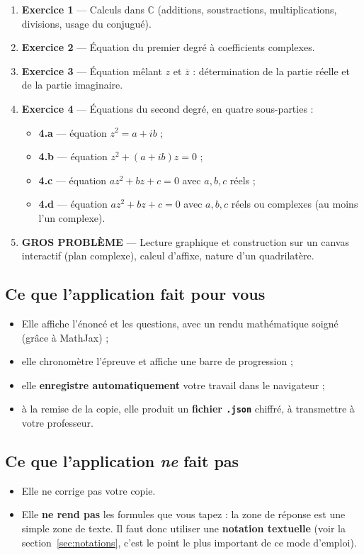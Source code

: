 \documentclass[11pt,a4paper]{article}
\begin{document}
\begin{enumerate}
  \item \textbf{Exercice 1} — Calculs dans \(\mathbb{C}\) (additions,
        soustractions, multiplications, divisions, usage du conjugué).
  \item \textbf{Exercice 2} — Équation du premier degré à coefficients
        complexes.
  \item \textbf{Exercice 3} — Équation mêlant \(z\) et \(\overline{z}\) :
        détermination de la partie réelle et de la partie imaginaire.
  \item \textbf{Exercice 4} — Équations du second degré, en quatre
        sous-parties :
    \begin{itemize}
      \item \textbf{4.a} — équation \(z^2 = a + ib\) ;
      \item \textbf{4.b} — équation \(z^2 + (a+ib)z = 0\) ;
      \item \textbf{4.c} — équation \(az^2 + bz + c = 0\) avec \(a,b,c\)
            réels ;
      \item \textbf{4.d} — équation \(az^2 + bz + c = 0\) avec \(a,b,c\)
            réels ou complexes (au moins l'un complexe).
    \end{itemize}
  \item \textbf{GROS PROBLÈME} — Lecture graphique et construction sur un
        canvas interactif (plan complexe), calcul d'affixe, nature d'un
        quadrilatère.
\end{enumerate}

\subsection*{Ce que l'application fait pour vous}
\begin{itemize}
  \item Elle affiche l'énoncé et les questions, avec un rendu mathématique
        soigné (grâce à MathJax) ;
  \item elle chronomètre l'épreuve et affiche une barre de progression ;
  \item elle \textbf{enregistre automatiquement} votre travail dans le
        navigateur ;
  \item à la remise de la copie, elle produit un \textbf{fichier
        \texttt{.json}} chiffré, à transmettre à votre professeur.
\end{itemize}

\subsection*{Ce que l'application \emph{ne} fait pas}
\begin{itemize}
  \item Elle ne corrige pas votre copie.
  \item Elle \textbf{ne rend pas} les formules que vous tapez : la zone de
        réponse est une simple zone de texte. Il faut donc utiliser une
        \textbf{notation textuelle} (voir la
        section~\ref{sec:notations}, c'est le point le plus important de ce
        mode d'emploi).
\end{itemize}
\end{document}
